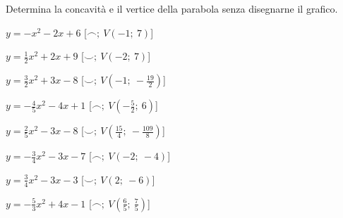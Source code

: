 \begin{esercizio}\label{ese:}
 Determina la concavità e il vertice della parabola senza disegnarne il grafico.
\begin{multicols}{2}
  \begin{enumeratea}
  \item  $y=- x^2 -2 x +6$
   \hfill [$\smallfrown;~V \left (-1;~7 \right )$]
  \item  $y=\frac{1}{2} x^2 +2 x +9$
   \hfill [$\smallsmile;~V \left (-2;~7 \right )$]
  \item  $y=\frac{3}{2} x^2 +3 x -8$
   \hfill [$\smallsmile;~V \left (-1;~-\frac{19}{2} \right )$]
  \item  $y=-\frac{4}{5} x^2 -4 x +1$
   \hfill [$\smallfrown;~V \left (-\frac{5}{2};~6 \right )$]
  \item  $y=\frac{2}{5} x^2 -3 x -8$
   \hfill [$\smallsmile;~V \left (\frac{15}{4};~-\frac{109}{8} \right )$]
  \item  $y=-\frac{3}{4} x^2 -3 x -7$
   \hfill [$\smallfrown;~V \left (-2;~-4 \right )$]
  \item  $y=\frac{3}{4} x^2 -3 x -3$
   \hfill [$\smallsmile;~V \left (2;~-6 \right )$]
  \item  $y=-\frac{5}{3} x^2 +4 x -1$
   \hfill [$\smallfrown;~V \left (\frac{6}{5};~\frac{7}{5} \right )$]
 \end{enumeratea}
\end{multicols}
\end{esercizio}

